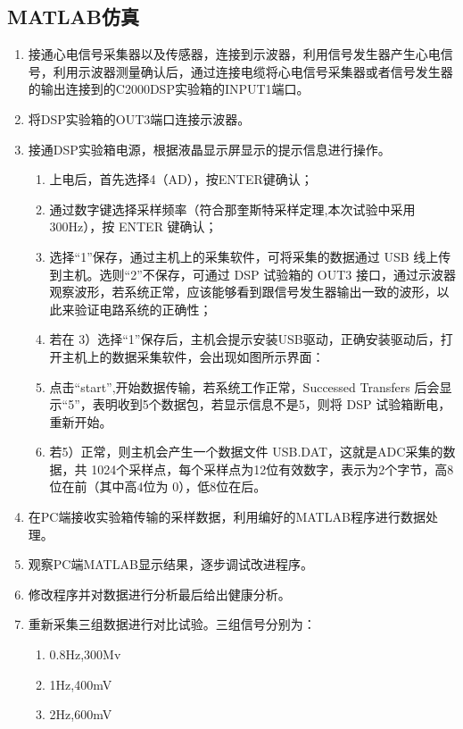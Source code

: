 \documentclass{article}
\newcounter{sub}
\begin{document}
\subsection{MATLAB仿真}%
\label{sub:MATLAB仿真}

\begin{enumerate}
	\item 接通心电信号采集器以及传感器，连接到示波器，利用信号发生器产生心电信号，利用示波器测量确认后，通过连接电缆将心电信号采集器或者信号发生器的输出连接到的C2000DSP实验箱的INPUT1端口。
	\item 将DSP实验箱的OUT3端口连接示波器。
	\item 接通DSP实验箱电源，根据液晶显示屏显示的提示信息进行操作。
		\begin{enumerate}
			\item 上电后，首先选择4（AD），按ENTER键确认；
			\item 通过数字键选择采样频率（符合那奎斯特采样定理,本次试验中采用300Hz），按 ENTER 键确认；
			\item 选择“1”保存，通过主机上的采集软件，可将采集的数据通过 USB 线上传到主机。选则“2”不保存，可通过 DSP 试验箱的 OUT3 接口，通过示波器观察波形，若系统正常，应该能够看到跟信号发生器输出一致的波形，以此来验证电路系统的正确性；
			\item 若在 3）选择“1”保存后，主机会提示安装USB驱动，正确安装驱动后，打开主机上的数据采集软件，会出现如图所示界面：
			\item 点击“start”,开始数据传输，若系统工作正常，Successed Transfers 后会显示“5”，表明收到5个数据包，若显示信息不是5，则将 DSP 试验箱断电，重新开始。
			\item 若5）正常，则主机会产生一个数据文件 USB.DAT，这就是ADC采集的数据，共 1024个采样点，每个采样点为12位有效数字，表示为2个字节，高8位在前（其中高4位为 0），低8位在后。
		\end{enumerate}
	\item 在PC端接收实验箱传输的采样数据，利用编好的MATLAB程序进行数据处理。
	\item 观察PC端MATLAB显示结果，逐步调试改进程序。
	\item 修改程序并对数据进行分析最后给出健康分析。
	\item 重新采集三组数据进行对比试验。三组信号分别为：
		\begin{enumerate}
			\item 0.8Hz,300Mv
			\item 1Hz,400mV
			\item 2Hz,600mV
		\end{enumerate}
\end{enumerate}
\end{document}
